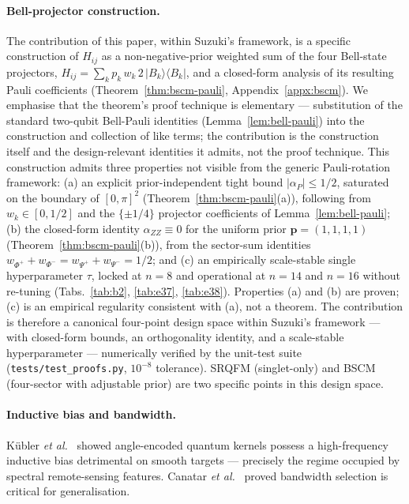 \documentclass[pdflatex,sn-mathphys]{sn-jnl}
\theoremstyle{plain}
\theoremstyle{remark}
\theoremstyle{definition}
\begin{document}
\paragraph{Bell-projector construction.}
The contribution of this paper, within Suzuki's framework, is a specific construction of $H_{ij}$ as a non-negative-prior weighted sum of the four Bell-state projectors, $H_{ij}=\sum_k p_k\,w_k\,2\,|B_k\rangle\!\langle B_k|$, and a closed-form analysis of its resulting Pauli coefficients (Theorem~\ref{thm:bscm-pauli}, Appendix~\ref{appx:bscm}).  We emphasise that the theorem's proof technique is elementary --- substitution of the standard two-qubit Bell-Pauli identities (Lemma~\ref{lem:bell-pauli}) into the construction and collection of like terms; the contribution is the construction itself and the design-relevant identities it admits, not the proof technique.  This construction admits three properties not visible from the generic Pauli-rotation framework: (a) an explicit prior-independent tight bound $|\alpha_P|\le 1/2$, saturated on the boundary of $[0,\pi]^2$ (Theorem~\ref{thm:bscm-pauli}(a)), following from $w_k\in[0,1/2]$ and the $\{\pm 1/4\}$ projector coefficients of Lemma~\ref{lem:bell-pauli}; (b) the closed-form identity $\alpha_{ZZ}\equiv 0$ for the uniform prior $\boldsymbol{p}=(1,1,1,1)$ (Theorem~\ref{thm:bscm-pauli}(b)), from the sector-sum identities $w_{\Phi^+}+w_{\Phi^-}=w_{\Psi^+}+w_{\Psi^-}=1/2$; and (c) an empirically scale-stable single hyperparameter $\tau$, locked at $n=8$ and operational at $n=14$ and $n=16$ without re-tuning (Tabs.~\ref{tab:b2}, \ref{tab:e37}, \ref{tab:e38}).  Properties (a) and (b) are proven; (c) is an empirical regularity consistent with (a), not a theorem.  The contribution is therefore a canonical four-point design space within Suzuki's framework --- with closed-form bounds, an orthogonality identity, and a scale-stable hyperparameter --- numerically verified by the unit-test suite (\texttt{tests/test\_proofs.py}, $10^{-8}$ tolerance).  SRQFM (singlet-only) and BSCM (four-sector with adjustable prior) are two specific points in this design space.

\paragraph{Inductive bias and bandwidth.}
K\"ubler \emph{et al.}\ \cite{kubler2021} showed angle-encoded quantum kernels possess a high-frequency inductive bias detrimental on smooth targets --- precisely the regime occupied by spectral remote-sensing features. Canatar \emph{et al.}\ \cite{canatar2022} proved bandwidth selection is critical for generalisation.
\end{document}

